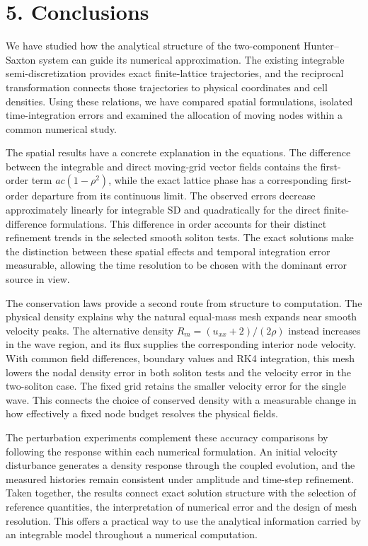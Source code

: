 \documentclass[11pt,a4paper]{article}
\begin{document}
\FloatBarrier
\section*{5. Conclusions}

We have studied how the analytical structure of the two-component Hunter–Saxton system can guide its numerical approximation. The existing integrable semi-discretization provides exact finite-lattice trajectories, and the reciprocal transformation connects those trajectories to physical coordinates and cell densities. Using these relations, we have compared spatial formulations, isolated time-integration errors and examined the allocation of moving nodes within a common numerical study.

The spatial results have a concrete explanation in the equations. The difference between the integrable and direct moving-grid vector fields contains the first-order term \(ac(1-\rho^2)\), while the exact lattice phase has a corresponding first-order departure from its continuous limit. The observed errors decrease approximately linearly for integrable SD and quadratically for the direct finite-difference formulations. This difference in order accounts for their distinct refinement trends in the selected smooth soliton tests. The exact solutions make the distinction between these spatial effects and temporal integration error measurable, allowing the time resolution to be chosen with the dominant error source in view.

The conservation laws provide a second route from structure to computation. The physical density explains why the natural equal-mass mesh expands near smooth velocity peaks. The alternative density \(R_m=(u_{xx}+2)/(2\rho)\) instead increases in the wave region, and its flux supplies the corresponding interior node velocity. With common field differences, boundary values and RK4 integration, this mesh lowers the nodal density error in both soliton tests and the velocity error in the two-soliton case. The fixed grid retains the smaller velocity error for the single wave. This connects the choice of conserved density with a measurable change in how effectively a fixed node budget resolves the physical fields.

The perturbation experiments complement these accuracy comparisons by following the response within each numerical formulation. An initial velocity disturbance generates a density response through the coupled evolution, and the measured histories remain consistent under amplitude and time-step refinement. Taken together, the results connect exact solution structure with the selection of reference quantities, the interpretation of numerical error and the design of mesh resolution. This offers a practical way to use the analytical information carried by an integrable model throughout a numerical computation.
\end{document}
